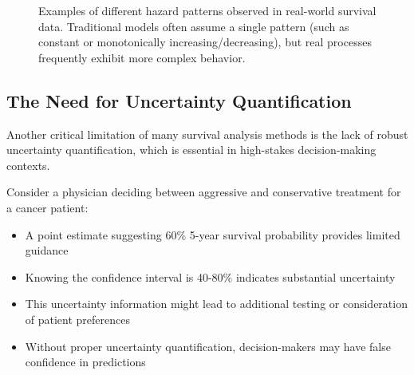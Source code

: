 \begin{figure}[htbp]
    \centering
    \caption{Examples of different hazard patterns observed in real-world survival data. Traditional models often assume a single pattern (such as constant or monotonically increasing/decreasing), but real processes frequently exhibit more complex behavior.}
    \label{fig:dsm-hazard-patterns}
\end{figure}

\subsection{The Need for Uncertainty Quantification}

Another critical limitation of many survival analysis methods is the lack of robust uncertainty quantification, which is essential in high-stakes decision-making contexts.

\begin{examplebox}[title=Clinical Decision-Making with Uncertainty]
Consider a physician deciding between aggressive and conservative treatment for a cancer patient:
\begin{itemize}
    \item A point estimate suggesting 60\% 5-year survival probability provides limited guidance
    \item Knowing the confidence interval is 40-80\% indicates substantial uncertainty
    \item This uncertainty information might lead to additional testing or consideration of patient preferences
    \item Without proper uncertainty quantification, decision-makers may have false confidence in predictions
\end{itemize}
\end{examplebox}

